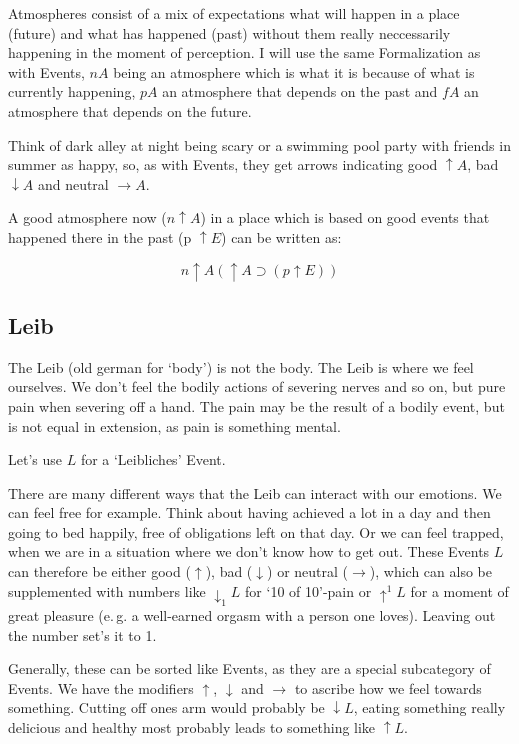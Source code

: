 \documentclass{scrartcl}
\begin{document}
Atmospheres consist of a mix of expectations what will happen in a place (future) and what has happened (past) without them
really neccessarily happening in the moment of perception. I will use the same Formalization as with Events,
$n A$ being an atmosphere which is what it is because of what is currently happening, $p A$ an atmosphere that
depends on the past and $f A$ an atmosphere that depends on the future.

Think of dark alley at night being scary or a swimming pool party with friends
in summer as happy, so, as with Events, they get arrows indicating good $\uparrow A$, bad $\downarrow A$ and neutral $\rightarrow A$.

A good atmosphere now ($n\uparrow A$) in a place which is based on good events that happened there in the past (p $\uparrow E$)  can be written as:

\begin{equation}n\uparrow A \left(
		\uparrow A \supset \left(
			p \uparrow E
		\right)
	\right)
\end{equation}

\subsection{Leib}

The Leib (old german for `body') is not the body. The Leib is where we feel ourselves. We don't feel the bodily actions of severing
nerves and so on, but pure pain when severing off a hand. The pain may be the result of a bodily event, but is not equal in extension,
as pain is something mental. 

Let's use $L$ for a `Leibliches' Event. 

There are many different ways that the Leib can interact with our emotions. We can feel free for example. Think about having achieved
a lot in a day and then going to bed happily, free of obligations left on that day. Or we can feel trapped, when we are in a situation
where we don't know how to get out. These Events $L$ can therefore be either good ($\uparrow$), bad ($\downarrow$) or neutral ($\rightarrow$),
which can also be supplemented with numbers like $\downarrow_1 L$ for `10 of 10'-pain or $\uparrow^1 L$ for a moment of great pleasure
(e.\,g. a well-earned orgasm with a person one loves). Leaving out the number set's it to 1.

Generally, these can be sorted like Events, as they are a special subcategory of Events. We have the modifiers $\uparrow$, $\downarrow$
and $\rightarrow$ to ascribe how we feel towards something. Cutting off ones arm would probably be $\downarrow L$, eating something
really delicious and healthy most probably leads to something like $\uparrow L$.
\end{document}
